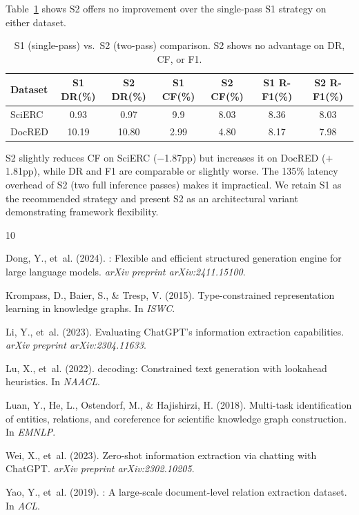 \documentclass[11pt,a4paper]{article}
\begin{document}
Table~\ref{tab:s1s2} shows S2 offers no improvement over the single-pass S1 strategy on either dataset.

\begin{table}[t]
\centering
\caption{S1 (single-pass) vs.\ S2 (two-pass) comparison. S2 shows no advantage on DR, CF, or F1.}
\label{tab:s1s2}
\begin{tabular}{lcccccc}
\toprule
\textbf{Dataset} & \textbf{S1 DR(\%)} & \textbf{S2 DR(\%)} & \textbf{S1 CF(\%)} & \textbf{S2 CF(\%)} & \textbf{S1 R-F1(\%)} & \textbf{S2 R-F1(\%)} \\
\midrule
SciERC  & 0.93  & 0.97  & 9.9  & 8.03 & 8.36 & 8.03 \\
DocRED  & 10.19 & 10.80 & 2.99 & 4.80 & 8.17 & 7.98 \\
\bottomrule
\end{tabular}
\end{table}

S2 slightly reduces CF on SciERC ($-$1.87pp) but increases it on DocRED ($+$1.81pp), while DR and F1 are comparable or slightly worse.
The 135\% latency overhead of S2 (two full inference passes) makes it impractical.
We retain S1 as the recommended strategy and present S2 as an architectural variant demonstrating framework flexibility.


\begin{thebibliography}{10}

Dong, Y., et~al. (2024).
: Flexible and efficient structured generation engine for large language models.
\newblock \emph{arXiv preprint arXiv:2411.15100}.

Krompass, D., Baier, S., \& Tresp, V. (2015).
\newblock Type-constrained representation learning in knowledge graphs.
\newblock In \emph{ISWC}.

Li, Y., et~al. (2023).
\newblock Evaluating {ChatGPT}'s information extraction capabilities.
\newblock \emph{arXiv preprint arXiv:2304.11633}.

Lu, X., et~al. (2022).
 decoding: Constrained text generation with lookahead heuristics.
\newblock In \emph{NAACL}.

Luan, Y., He, L., Ostendorf, M., \& Hajishirzi, H. (2018).
\newblock Multi-task identification of entities, relations, and coreference for scientific knowledge graph construction.
\newblock In \emph{EMNLP}.

Wei, X., et~al. (2023).
\newblock Zero-shot information extraction via chatting with {ChatGPT}.
\newblock \emph{arXiv preprint arXiv:2302.10205}.

Yao, Y., et~al. (2019).
: A large-scale document-level relation extraction dataset.
\newblock In \emph{ACL}.

\end{thebibliography}
\end{document}
